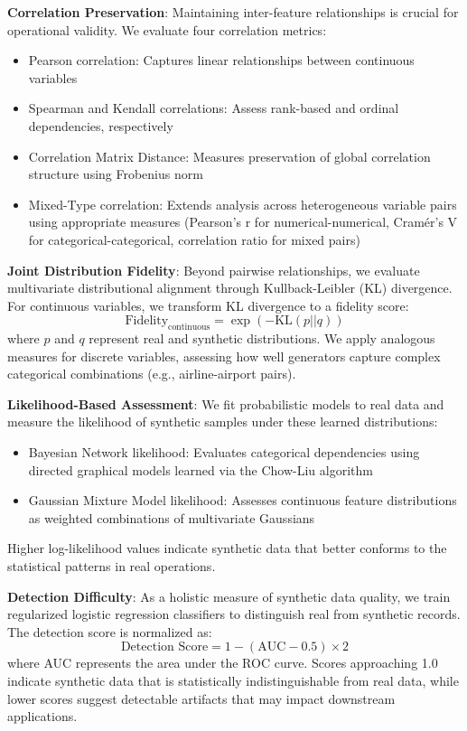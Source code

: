 \documentclass[conference]{IEEEtran}
\begin{document}
\textbf{Correlation Preservation}:
Maintaining inter-feature relationships is crucial for operational validity. We evaluate four correlation metrics:
\begin{itemize}
    \item Pearson correlation: Captures linear relationships between continuous variables
    \item Spearman and Kendall correlations: Assess rank-based and ordinal dependencies, respectively
    \item Correlation Matrix Distance: Measures preservation of global correlation structure using Frobenius norm
    \item Mixed-Type correlation: Extends analysis across heterogeneous variable pairs using appropriate measures (Pearson's r for numerical-numerical, Cramér's V for categorical-categorical, correlation ratio for mixed pairs)
\end{itemize}

\textbf{Joint Distribution Fidelity}:
Beyond pairwise relationships, we evaluate multivariate distributional alignment through Kullback-Leibler (KL) divergence. For continuous variables, we transform KL divergence to a fidelity score:
\begin{equation}
\text{Fidelity}_{\text{continuous}} = \exp(-\text{KL}(p||q))
\end{equation}
where $p$ and $q$ represent real and synthetic distributions. We apply analogous measures for discrete variables, assessing how well generators capture complex categorical combinations (e.g., airline-airport pairs).

\textbf{Likelihood-Based Assessment}:
We fit probabilistic models to real data and measure the likelihood of synthetic samples under these learned distributions:
\begin{itemize}
    \item Bayesian Network likelihood: Evaluates categorical dependencies using directed graphical models learned via the Chow-Liu algorithm
    \item Gaussian Mixture Model likelihood: Assesses continuous feature distributions as weighted combinations of multivariate Gaussians
\end{itemize}
Higher log-likelihood values indicate synthetic data that better conforms to the statistical patterns in real operations.

\textbf{Detection Difficulty}:
As a holistic measure of synthetic data quality, we train regularized logistic regression classifiers to distinguish real from synthetic records. The detection score is normalized as:
\begin{equation}
\text{Detection Score} = 1 - (\text{AUC} - 0.5) \times 2
\end{equation}
where AUC represents the area under the ROC curve. Scores approaching 1.0 indicate synthetic data that is statistically indistinguishable from real data, while lower scores suggest detectable artifacts that may impact downstream applications.
\end{document}
